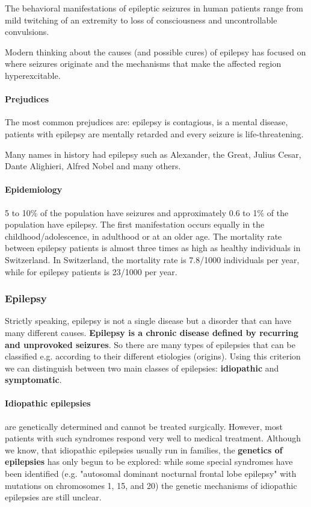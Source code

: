 \documentclass[12pt,article,oneside,a4paper]{memoir}
\begin{document}
The behavioral manifestations of epileptic seizures in human patients range from mild twitching of an extremity to loss of consciousness and uncontrollable convulsions. 

Modern thinking about the causes (and possible cures) of epilepsy has focused on where seizures originate and the mechanisms that make the affected region hyperexcitable. 

\paragraph{Prejudices} The most common prejudices are: epilepsy is contagious, is a mental disease, patients with epilepsy are mentally retarded and every seizure is life-threatening.

Many names in history had epilepsy such as Alexander, the Great, Julius Cesar, Dante Alighieri, Alfred Nobel and many others.

\paragraph{Epidemiology}
5 to 10\% of the population have seizures and approximately 0.6 to 1\% of the population have epilepsy. The first manifestation occurs equally in the childhood/adolescence, in adulthood or at an older age.
The mortality rate between epilepsy patients is almost three times as high as healthy individuals in Switzerland. In Switzerland, the mortality rate is 7.8/1000 individuals per year, while for epilepsy patients is 23/1000 per year.

\subsubsection{Epilepsy}
Strictly speaking, epilepsy is not a single disease but a disorder that can have many different causes. \textbf{Epilepsy is a chronic disease defined by recurring and unprovoked seizures}.
So there are many types of epilepsies that can be classified e.g. according to their different etiologies (origins). Using this criterion we can distinguish between two main classes of epilepsies: \textbf{idiopathic} and \textbf{symptomatic}.

\paragraph{Idiopathic epilepsies} are genetically determined and cannot be treated surgically. However, most patients with such syndromes respond very well to medical treatment. Although we know, that idiopathic epilepsies usually run in families, the \textbf{genetics of epilepsies} has only begun to be explored: while some special syndromes have been identified (e.g. "autosomal dominant nocturnal frontal lobe epilepsy" with mutations on chromosomes 1, 15, and 20) the genetic mechanisms of idiopathic epilepsies are still unclear.
\end{document}

